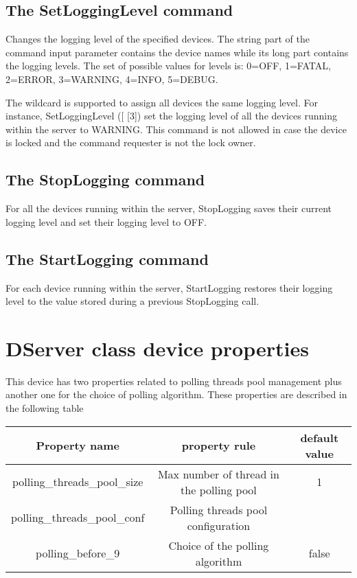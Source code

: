 \subsection{The SetLoggingLevel command}

Changes the logging level of the specified devices. The string part
of the command input parameter contains the device names while its
long part contains the logging levels. The set of possible values
for levels is: 0=OFF, 1=FATAL, 2=ERROR, 3=WARNING, 4=INFO, 5=DEBUG. 

The wildcard \textquotedbl{}{*}\textquotedbl{} is supported to assign
all devices the same logging level. For instance, SetLoggingLevel
({[}\textquotedbl{}{*}\textquotedbl{}{]} {[}3{]}) set the logging
level of all the devices running within the server to WARNING. This
command is not allowed in case the device is locked and the command
requester is not the lock owner.


\subsection{The StopLogging command}

For all the devices running within the server, StopLogging saves their
current logging level and set their logging level to OFF. 


\subsection{The StartLogging command}

For each device running within the server, StartLogging restores their
logging level to the value stored during a previous StopLogging call.


\section{DServer class device properties}

This device has two properties related to polling threads pool management
plus another one for the choice of polling algorithm. These properties
are described in the following table 

\vspace{0.3cm}


\begin{center}
\begin{longtable}{|c|c|c|}
\hline 
Property name & property rule & default value\tabularnewline
\hline 
\hline 
polling\_threads\_pool\_size & Max number of thread in the polling pool & 1\tabularnewline
\hline 
polling\_threads\_pool\_conf & Polling threads pool configuration & \tabularnewline
\hline 
polling\_before\_9 & Choice of the polling algorithm & false\tabularnewline
\hline 
\end{longtable}
\par\end{center}

